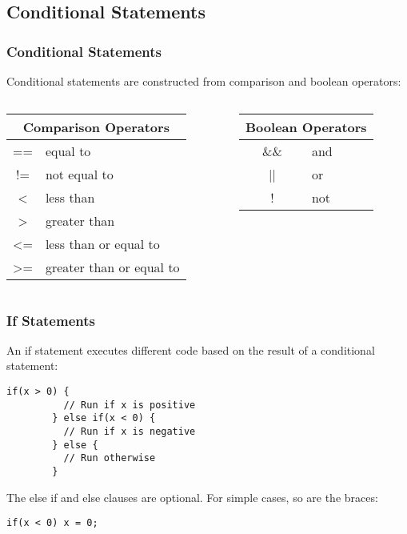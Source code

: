\subsection{Conditional Statements}
\label{sub:conditional_statements}
\begin{frame}
	\frametitle{Conditional Statements}
	Conditional statements are constructed from comparison and boolean operators:
	\begin{columns}[T]
		\begin{column}{0.5\textwidth}
			\begin{center}
				\begin{tabular}{c|l}
					\multicolumn{2}{c}{Comparison Operators}\\
					\hline
					== & equal to\\
					!= & not equal to\\
					< & less than\\
					> & greater than\\
					<= & less than or equal to\\
					>= & greater than or equal to\\
				\end{tabular}
			\end{center}
		\end{column}
		\begin{column}{0.5\textwidth}
			\begin{center}
				\begin{tabular}{c|l}
					\multicolumn{2}{c}{Boolean Operators}\\
					\hline
					\&\& & and\\
					|| & or\\
					! & not\\
				\end{tabular}
			\end{center}
		\end{column}
	\end{columns}
\end{frame}

\begin{frame}[fragile]
	\frametitle{If Statements}
	An if statement executes different code based on the result of a conditional statement:
	\begin{lstlisting}[numbers=none]
		if(x > 0) {
		  // Run if x is positive
		} else if(x < 0) {
		  // Run if x is negative
		} else {
		  // Run otherwise
		}
	\end{lstlisting}
	The else if and else clauses are optional. For simple cases, so are the braces:
	\begin{lstlisting}[numbers=none]
		if(x < 0) x = 0;
	\end{lstlisting}
\end{frame}

